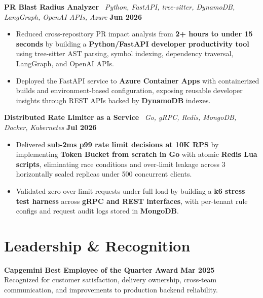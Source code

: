 \documentclass[10pt,letterpaper]{article}
\begin{document}
\textbf{PR Blast Radius Analyzer}
\textbar\ \textit{Python, FastAPI, tree-sitter, DynamoDB, LangGraph, OpenAI APIs, Azure}
\hfill \textbf{Jun 2026}
\begin{itemize}
  \item Reduced cross-repository PR impact analysis from
  \textbf{2+ hours to under 15 seconds} by building a
  \textbf{Python/FastAPI developer productivity tool} using tree-sitter AST
  parsing, symbol indexing, dependency traversal, LangGraph, and OpenAI APIs.
  \item Deployed the FastAPI service to \textbf{Azure Container Apps} with
  containerized builds and environment-based configuration, exposing reusable
  developer insights through REST APIs backed by \textbf{DynamoDB} indexes.
\end{itemize}
\vspace{2pt}

\textbf{Distributed Rate Limiter as a Service}
\textbar\ \textit{Go, gRPC, Redis, MongoDB, Docker, Kubernetes}
\hfill \textbf{Jul 2026}
\begin{itemize}
  \item Delivered \textbf{sub-2ms p99 rate limit decisions at 10K RPS} by
  implementing \textbf{Token Bucket from scratch in Go} with atomic
  \textbf{Redis Lua scripts}, eliminating race conditions and over-limit
  leakage across 3 horizontally scaled replicas under 500 concurrent clients.
  \item Validated zero over-limit requests under full load by building a
  \textbf{k6 stress test harness} across \textbf{gRPC and REST interfaces},
  with per-tenant rule configs and request audit logs stored in \textbf{MongoDB}.
\end{itemize}
\vspace{2pt}

\section*{Leadership \& Recognition}
\textbf{Capgemini Best Employee of the Quarter Award}
\hfill \textbf{Mar 2025}\\
Recognized for customer satisfaction, delivery ownership, cross-team
communication, and improvements to production backend reliability.
\end{document}
